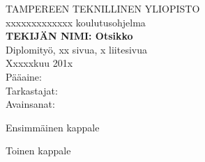 \setcounter{page}{1} %


\begin{spacing}{1.0}
\textsf{TAMPEREEN TEKNILLINEN YLIOPISTO}\\
\textsf{xxxxxxxxxxxxx koulutusohjelma}\\
{\bf \textsf{TEKIJÄN NIMI: Otsikko}}\\
\textsf{Diplomityö, xx sivua, x liitesivua}\\
\textsf{Xxxxxkuu 201x}\\
\textsf{Pääaine: }\\
\textsf{Tarkastajat: }\\
\textsf{Avainsanat: }\\
\end{spacing}

\noindent
Ensimmäinen kappale

\noindent
Toinen kappale